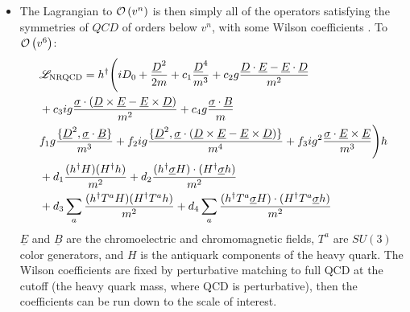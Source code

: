\begin{itemize}
\item
The Lagrangian to $\mathcal{O}\left( v^n \right)$ is then simply all of the operators satisfying the symmetries of $QCD$ of orders below $v^n$, with some Wilson coefficients \cite{Lepage:1992tx}. To $\mathcal{O}\left( v^6 \right)$:
\begin{align}
\nonumber
	&\mathscr{L}_{\text{NRQCD}} = h^{\dagger} \Bigg( i D_0 + {\underline{D}^2 \over 2m} + c_1 {\underline{D}^4\over m^3}
	+ c_2 g{\underline{D}\cdot \underline{E} - \underline{E} \cdot \underline{D} \over m^2} \\
	\nonumber
	&+ c_3 ig{ \underline{\sigma}\cdot (\underline{D}\times \underline{E} - \underline{E}\times \underline{D})\over m^2}
	+ c_4 g{ \underline{\sigma}\cdot \underline{B}\over m} \\
	\nonumber
	& f_1 g{\{\underline{D}^2,\underline{\sigma}\cdot \underline{B}\}\over m^3 }  
	+ f_2 ig{\{ \underline{D}^2,\underline{\sigma}\cdot ( \underline{D}\times \underline{E} - \underline{E}\times \underline{D})\}\over m^4 }
	+ f_3 ig^2 {\underline{\sigma}\cdot \underline{E}\times \underline{E}\over m^3}  \Bigg)h \\
	\nonumber
	&+ d_1 { (h^{\dagger} H) (H^{\dagger} h) \over m^2} + d_2 { (h^{\dagger} \underline{\sigma} H) \cdot  (H^{\dagger}\underline{\sigma} h) \over m^2} \\
	&+ d_3 \sum_a {(h^{\dagger} T^a H) (H^{\dagger} T^a h) \over m^2} + d_4 \sum_a {(h^{\dagger} T^a \underline{\sigma} H) \cdot (H^{\dagger} T^a \underline{\sigma} h) \over m^2}
\end{align}
$\underline{E}$ and $\underline{B}$ are the chromoelectric and chromomagnetic fields, $T^a$ are $SU(3)$ color generators, and $H$ is the antiquark components of the heavy quark. The Wilson coefficients are fixed by perturbative matching to full QCD at the cutoff (the heavy quark mass, where QCD is perturbative), then the coefficients can be run down to the scale of interest.

\end{itemize}



